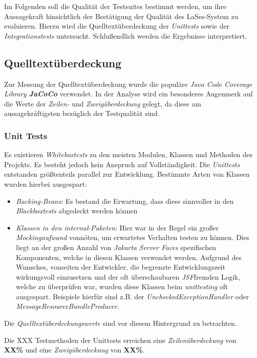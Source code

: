 Im Folgenden soll die Qualität der Testsuites bestimmt werden,
um ihre Aussagekraft hinsichtlich der Bestätigung der Qualität des LaSes-System zu evaluieren.
Hierzu wird die Quelltextüberdeckung der \emph{Unittests} sowie der \emph{Integrationstests} untersucht.
Schlußendlich werden die Ergebnisse interpretiert.

\subsection{Quelltextüberdeckung}
Zur Messung der Quelltextüberdeckung wurde die populäre \emph{Java Code Coverage Library \textbf{JaCoCo}} verwendet.
In der Analyse wird ein besonderes Augenmerk auf die Werte der \emph{Zeilen-} und \emph{Zweigüberdeckung} gelegt,
da diese am aussagekräftigsten bezüglich der Testqualität sind.

\subsubsection{Unit Tests}
Es existieren \emph{Whiteboxtests} zu den meisten Modulen, Klassen und Methoden des Projekts.
Es besteht jedoch kein Anspruch auf Vollständigkeit.
Die \emph{Unittests} entstanden größtenteils parallel zur Entwicklung.
Bestimmte Arten von Klassen wurden hierbei ausgespart:

\begin{itemize}
    \item \emph{Backing-Beans}: Es bestand die Erwartung, dass diese sinnvoller in den \emph{Blackboxtests}
    abgedeckt werden können
    \item \emph{Klassen in den internal-Paketen}: Hier war in der Regel ein großer \emph{Mockingaufwand} vonnöten,
    um erwartetes Verhalten testen zu können.
    Dies liegt an der großen Anzahl von \emph{Jakarta Server Faces} spezifischen Komponenten,
    welche in diesen Klassen verwendet werden.
    Aufgrund des Wunsches, vonseiten der Entwickler, die begrenzte Entwicklungszeit
    wirkungsvoll einzusetzen und der oft überschaubaren \emph{JSF}\-fremden Logik, welche zu überprüfen war,
    wurden diese Klassen beim \emph{unittesting} oft ausgespart.
    Beispiele hierfür sind z.B. der \emph{UncheckedExceptionHandler} oder \emph{MessageResourceBundleProducer}.
\end{itemize}
Die \emph{Quelltextüberdeckungswerte} sind vor diesem Hintergrund zu betrachten.

Die XXX Testmethoden der Unittests erreichen eine \emph{Zeilenüberdeckung} von \textbf{XX\%}
und eine \emph{Zweigüberdeckung} von \textbf{XX\%}.

